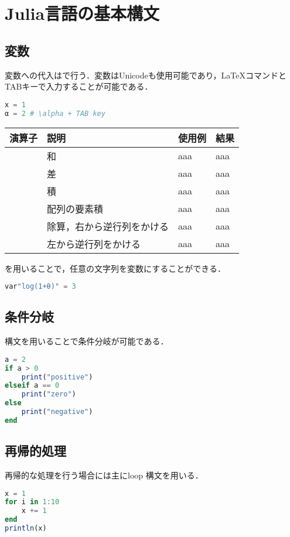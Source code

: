 \section{Julia言語の基本構文}
\subsection{変数}
変数への代入は\jl{=}で行う．変数はUnicodeも使用可能であり，LaTeXコマンドとTABキーで入力することが可能である．
\begin{lstlisting}[language=julia]
x = 1
α = 2 # \alpha + TAB key
\end{lstlisting}
\begin{table}[h]
\centering
\begin{tabular}{|c|l|l|l|}
\hline
演算子 & 説明 & 使用例 & 結果 \\
\hline
\jl{+} & 和 & aaa & aaa \\
\hline
\jl{-} & 差 & aaa & aaa \\
\hline
\jl{*} & 積 & aaa & aaa \\
\hline
\jl{.*} & 配列の要素積 & aaa & aaa \\
\hline
\jl{/} & 除算，右から逆行列をかける & aaa & aaa \\
\hline
\jl{\} & 左から逆行列をかける & aaa & aaa \\
\hline
\end{tabular}
\end{table}
を用いることで，任意の文字列を変数にすることができる．
\begin{lstlisting}[language=julia]
var"log(1+θ)" = 3
\end{lstlisting}
\subsection{条件分岐}
構文を用いることで条件分岐が可能である．
\begin{lstlisting}[language=julia]
a = 2
if a > 0
    print("positive")
elseif a == 0
    print("zero")
else
    print("negative")
end
\end{lstlisting}
\subsection{再帰的処理}
再帰的な処理を行う場合には主にloop 構文を用いる．
\begin{lstlisting}[language=julia]
x = 1
for i in 1:10
    x += 1
end
println(x)
\end{lstlisting}

